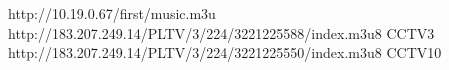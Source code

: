 http://10.19.0.67/first/music.m3u
http://183.207.249.14/PLTV/3/224/3221225588/index.m3u8     CCTV3
http://183.207.249.14/PLTV/3/224/3221225550/index.m3u8     CCTV10